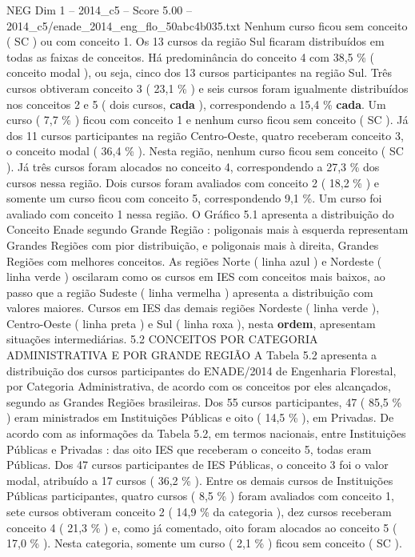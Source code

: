 \begin{textsample}{NEG Dim 1 – 2014\_c5 – Score 5.00 – 2014\_c5/enade\_2014\_eng\_flo\_50abc4b035.txt}
Nenhum curso ficou sem conceito ( SC ) ou com conceito 1.
Os 13 cursos da região Sul ficaram distribuídos em todas as faixas de conceitos.
Há predominância do conceito 4 com 38,5 \% ( conceito modal ), ou seja, cinco dos 13 cursos participantes na região Sul.
Três cursos obtiveram conceito 3 ( 23,1 \% ) e seis cursos foram igualmente distribuídos nos conceitos 2 e 5 ( dois cursos, \textbf{cada} ), correspondendo a 15,4 \% \textbf{cada}.
Um curso ( 7,7 \% ) ficou com conceito 1 e nenhum curso ficou sem conceito ( SC ).
Já dos 11 cursos participantes na região Centro-Oeste, quatro receberam conceito 3, o conceito modal ( 36,4 \% ).
Nesta região, nenhum curso ficou sem conceito ( SC ).
Já três cursos foram alocados no conceito 4, correspondendo a 27,3 \% dos cursos nessa região.
Dois cursos foram avaliados com conceito 2 ( 18,2 \% ) e somente um curso ficou com conceito 5, correspondendo 9,1 \%.
Um curso foi avaliado com conceito 1 nessa região.
O Gráfico 5.1 apresenta a distribuição do Conceito Enade segundo Grande Região : poligonais mais à esquerda representam Grandes Regiões com pior distribuição, e poligonais mais à direita, Grandes Regiões com melhores conceitos.
As regiões Norte ( linha azul ) e Nordeste ( linha verde ) oscilaram como os cursos em IES com conceitos mais baixos, ao passo que a região Sudeste ( linha vermelha ) apresenta a distribuição com valores maiores.
Cursos em IES das demais regiões Nordeste ( linha verde ), Centro-Oeste ( linha preta ) e Sul ( linha roxa ), nesta \textbf{ordem}, apresentam situações intermediárias. 5.2 CONCEITOS POR CATEGORIA ADMINISTRATIVA E POR GRANDE REGIÃO A Tabela 5.2 apresenta a distribuição dos cursos participantes do ENADE/2014 de Engenharia Florestal, por Categoria Administrativa, de acordo com os conceitos por eles alcançados, segundo as Grandes Regiões brasileiras.
Dos 55 cursos participantes, 47 ( 85,5 \% ) eram ministrados em Instituições Públicas e oito ( 14,5 \% ), em Privadas.
De acordo com as informações da Tabela 5.2, em termos nacionais, entre Instituições Públicas e Privadas : das oito IES que receberam o conceito 5, todas eram Públicas.
Dos 47 cursos participantes de IES Públicas, o conceito 3 foi o valor modal, atribuído a 17 cursos ( 36,2 \% ).
Entre os demais cursos de Instituições Públicas participantes, quatro cursos ( 8,5 \% ) foram avaliados com conceito 1, sete cursos obtiveram conceito 2 ( 14,9 \% da categoria ), dez cursos receberam conceito 4 ( 21,3 \% ) e, como já comentado, oito foram alocados ao conceito 5 ( 17,0 \% ).
Nesta categoria, somente um curso ( 2,1 \% ) ficou sem conceito ( SC ).

\end{textsample}
